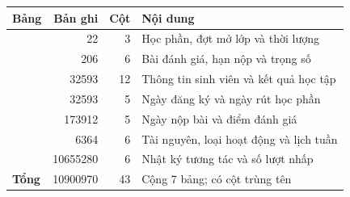 \begin{tabularx}{\linewidth}{@{}lrrY@{}}
\toprule
\textbf{Bảng} & \textbf{Bản ghi} & \textbf{Cột} & \textbf{Nội dung} \\
\midrule
{} & \num{22} & \num{3} & Học phần, đợt mở lớp và thời lượng \\
 & \num{206} & \num{6} & Bài đánh giá, hạn nộp và trọng số \\
 & \num{32593} & \num{12} & Thông tin sinh viên và kết quả học tập \\
 & \num{32593} & \num{5} & Ngày đăng ký và ngày rút học phần \\
 & \num{173912} & \num{5} & Ngày nộp bài và điểm đánh giá \\
 & \num{6364} & \num{6} & Tài nguyên, loại hoạt động và lịch tuần \\
 & \num{10655280} & \num{6} & Nhật ký tương tác và số lượt nhấp \\
\textbf{Tổng} & \num{10900970} & \num{43} & Cộng 7 bảng; có cột trùng tên \\
\bottomrule
\end{tabularx}
